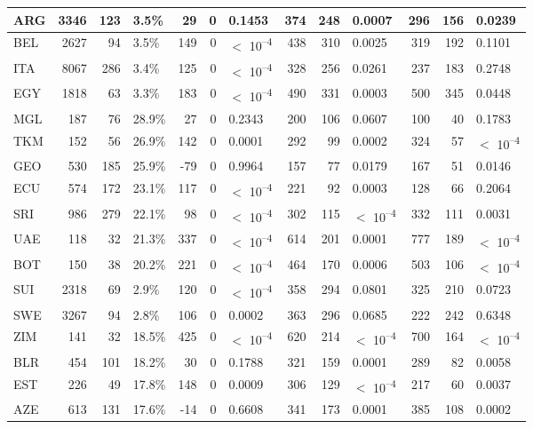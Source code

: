 \begin{tabular}{l|r|r|l|r|r|l|r|r|l|r|r|l}
\hline
ARG & 3346 & 123 & 3.5\% & 29 & 0 & 0.1453 & 374 & 248 & 0.0007 & 296 & 156 & 0.0239\\
\hline
BEL & 2627 & 94 & 3.5\% & 149 & 0 & $<$ 10\textsuperscript{--4} & 438 & 310 & 0.0025 & 319 & 192 & 0.1101\\
\hline
ITA & 8067 & 286 & 3.4\% & 125 & 0 & $<$ 10\textsuperscript{--4} & 328 & 256 & 0.0261 & 237 & 183 & 0.2748\\
\hline
EGY & 1818 & 63 & 3.3\% & 183 & 0 & $<$ 10\textsuperscript{--4} & 490 & 331 & 0.0003 & 500 & 345 & 0.0448\\
\hline
MGL & 187 & 76 & 28.9\% & 27 & 0 & 0.2343 & 200 & 106 & 0.0607 & 100 & 40 & 0.1783\\
\hline
TKM & 152 & 56 & 26.9\% & 142 & 0 & 0.0001 & 292 & 99 & 0.0002 & 324 & 57 & $<$ 10\textsuperscript{--4}\\
\hline
GEO & 530 & 185 & 25.9\% & -79 & 0 & 0.9964 & 157 & 77 & 0.0179 & 167 & 51 & 0.0146\\
\hline
ECU & 574 & 172 & 23.1\% & 117 & 0 & $<$ 10\textsuperscript{--4} & 221 & 92 & 0.0003 & 128 & 66 & 0.2064\\
\hline
SRI & 986 & 279 & 22.1\% & 98 & 0 & $<$ 10\textsuperscript{--4} & 302 & 115 & $<$ 10\textsuperscript{--4} & 332 & 111 & 0.0031\\
\hline
UAE & 118 & 32 & 21.3\% & 337 & 0 & $<$ 10\textsuperscript{--4} & 614 & 201 & 0.0001 & 777 & 189 & $<$ 10\textsuperscript{--4}\\
\hline
BOT & 150 & 38 & 20.2\% & 221 & 0 & $<$ 10\textsuperscript{--4} & 464 & 170 & 0.0006 & 503 & 106 & $<$ 10\textsuperscript{--4}\\
\hline
SUI & 2318 & 69 & 2.9\% & 120 & 0 & $<$ 10\textsuperscript{--4} & 358 & 294 & 0.0801 & 325 & 210 & 0.0723\\
\hline
SWE & 3267 & 94 & 2.8\% & 106 & 0 & 0.0002 & 363 & 296 & 0.0685 & 222 & 242 & 0.6348\\
\hline
ZIM & 141 & 32 & 18.5\% & 425 & 0 & $<$ 10\textsuperscript{--4} & 620 & 214 & $<$ 10\textsuperscript{--4} & 700 & 164 & $<$ 10\textsuperscript{--4}\\
\hline
BLR & 454 & 101 & 18.2\% & 30 & 0 & 0.1788 & 321 & 159 & 0.0001 & 289 & 82 & 0.0058\\
\hline
EST & 226 & 49 & 17.8\% & 148 & 0 & 0.0009 & 306 & 129 & $<$ 10\textsuperscript{--4} & 217 & 60 & 0.0037\\
\hline
AZE & 613 & 131 & 17.6\% & -14 & 0 & 0.6608 & 341 & 173 & 0.0001 & 385 & 108 & 0.0002\\

\end{tabular}
